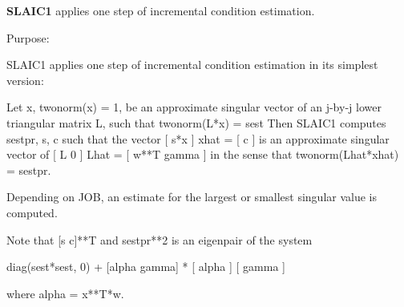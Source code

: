 {\bfseries S\+L\+A\+I\+C1} applies one step of incremental condition estimation. 

 \begin{DoxyParagraph}{Purpose\+: }
\begin{DoxyVerb} SLAIC1 applies one step of incremental condition estimation in
 its simplest version:

 Let x, twonorm(x) = 1, be an approximate singular vector of an j-by-j
 lower triangular matrix L, such that
          twonorm(L*x) = sest
 Then SLAIC1 computes sestpr, s, c such that
 the vector
                 [ s*x ]
          xhat = [  c  ]
 is an approximate singular vector of
                 [ L      0  ]
          Lhat = [ w**T gamma ]
 in the sense that
          twonorm(Lhat*xhat) = sestpr.

 Depending on JOB, an estimate for the largest or smallest singular
 value is computed.

 Note that [s c]**T and sestpr**2 is an eigenpair of the system

     diag(sest*sest, 0) + [alpha  gamma] * [ alpha ]
                                           [ gamma ]

 where  alpha =  x**T*w.\end{DoxyVerb}
 
\end{DoxyParagraph}

